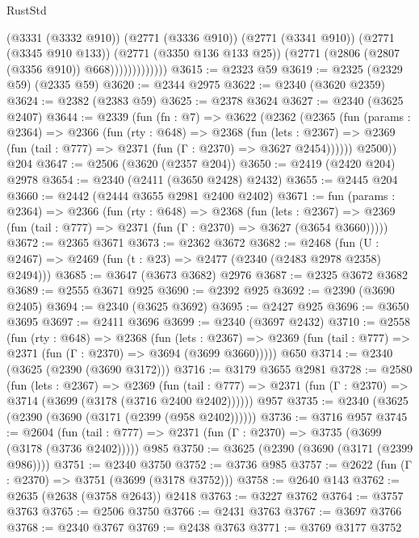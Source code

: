 \begin{lexlean}{RustStd}
\begin{coremodule}
                          (@3331 (@3332 @910))
                          (@2771 (@3336 @910))
                          (@2771 (@3341 @910))
                          (@2771 (@3345 @910 @133))
                          (@2771 (@3350 @136 @133 @25))
                          (@2771 (@2806 (@2807 (@3356 @910)) @668)))))))))))))
@3615 := @2323 @59
@3619 := @2325 (@2329 @59) (@2335 @59)
@3620 := @2344 @2975
@3622 := @2340 (@3620 @2359)
@3624 := @2382 (@2383 @59)
@3625 := @2378 @3624
@3627 := @2340 (@3625 @2407)
@3644 := @2339
    (fun (fn : @7) =>
    @3622
      (@2362
        (@2365
          (fun (params : @2364) =>
          @2366
            (fun (rty : @648) =>
            @2368
              (fun (lets : @2367) =>
              @2369 (fun (tail : @777) => @2371 (fun (Γ : @2370) => @3627 @2454))))))
        @2500))
    @204
@3647 := @2506 (@3620 (@2357 @204))
@3650 := @2419 (@2420 @204) @2978
@3654 := @2340 (@2411 (@3650 @2428) @2432)
@3655 := @2445 @204
@3660 := @2442 (@2444 @3655 @2981 @2400 @2402)
@3671 := fun (params : @2364) =>
  @2366
    (fun (rty : @648) =>
    @2368
      (fun (lets : @2367) =>
      @2369 (fun (tail : @777) => @2371 (fun (Γ : @2370) => @3627 (@3654 @3660)))))
@3672 := @2365 @3671
@3673 := @2362 @3672
@3682 := @2468 (fun (U : @2467) => @2469 (fun (t : @23) => @2477 (@2340 (@2483 @2978 @2358) @2494)))
@3685 := @3647 (@3673 @3682) @2976
@3687 := @2325 @3672 @3682
@3689 := @2555 @3671 @925
@3690 := @2392 @925
@3692 := @2390 (@3690 @2405)
@3694 := @2340 (@3625 @3692)
@3695 := @2427 @925
@3696 := @3650 @3695
@3697 := @2411 @3696
@3699 := @2340 (@3697 @2432)
@3710 := @2558
    (fun (rty : @648) =>
    @2368
      (fun (lets : @2367) =>
      @2369 (fun (tail : @777) => @2371 (fun (Γ : @2370) => @3694 (@3699 @3660)))))
    @650
@3714 := @2340 (@3625 (@2390 (@3690 @3172)))
@3716 := @3179 @3655 @2981
@3728 := @2580
    (fun (lets : @2367) =>
    @2369
      (fun (tail : @777) => @2371 (fun (Γ : @2370) => @3714 (@3699 (@3178 (@3716 @2400 @2402))))))
    @957
@3735 := @2340 (@3625 (@2390 (@3690 (@3171 (@2399 (@958 @2402))))))
@3736 := @3716 @957
@3745 := @2604
    (fun (tail : @777) => @2371 (fun (Γ : @2370) => @3735 (@3699 (@3178 (@3736 @2402)))))
    @985
@3750 := @3625 (@2390 (@3690 (@3171 (@2399 @986))))
@3751 := @2340 @3750
@3752 := @3736 @985
@3757 := @2622 (fun (Γ : @2370) => @3751 (@3699 (@3178 @3752)))
@3758 := @2640 @143
@3762 := @2635 (@2638 (@3758 @2643)) @2418
@3763 := @3227 @3762
@3764 := @3757 @3763
@3765 := @2506 @3750
@3766 := @2431 @3763
@3767 := @3697 @3766
@3768 := @2340 @3767
@3769 := @2438 @3763
@3771 := @3769 @3177 @3752

\end{coremodule}
\end{lexlean}
